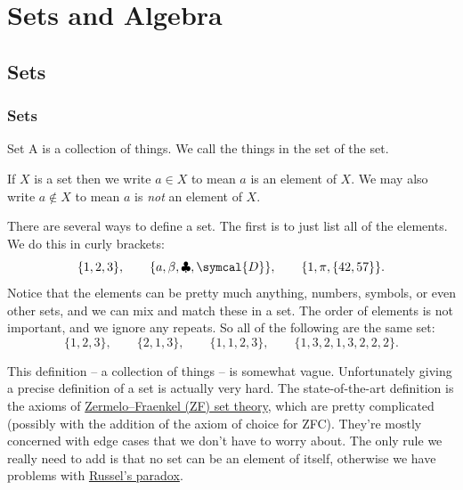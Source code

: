 \documentclass[fleqn]{LectureClass/LectureClass}
\begin{document}
    \part{Sets and Algebra}
    \chapter{Sets}
    \section{Sets}
    \begin{dfn}{Set}{}
        A  is a collection of things.
        We call the things in the set  of the set.
    \end{dfn}
    
    \begin{ntn}{}{}
        If \(X\) is a set then we write \(a \in X\) to mean \(a\) is an element of \(X\).
        We may also write \(a \notin X\) to mean \(a\) is \emph{not} an element of \(X\).
    \end{ntn}
    
    There are several ways to define a set.
    The first is to just list all of the elements.
    We do this in curly brackets:
    \begin{equation}
        \{1, 2, 3\}, \qquad \{a, \beta, \clubsuit, \symcal{D}\}, \qquad \{1, \pi, \{42, 57\}\}.
    \end{equation}
    Notice that the elements can be pretty much anything, numbers, symbols, or even other sets, and we can mix and match these in a set.
    The order of elements is not important, and we ignore any repeats.
    So all of the following are the same set:
    \begin{equation}
        \{1, 2, 3\}, \qquad \{2, 1, 3\}, \qquad \{1, 1, 2, 3\}, \qquad \{1, 3, 2, 1, 3, 2, 2, 2\}.
    \end{equation}
    
    \begin{remark}{}{}
        This definition -- a collection of things -- is somewhat vague.
        Unfortunately giving a precise definition of a set is actually very hard.
        The state-of-the-art definition is the axioms of \href{https://en.wikipedia.org/wiki/Zermelo%E2%80%93Fraenkel_set_theory}{Zermelo--Fraenkel (ZF) set theory}, which are pretty complicated (possibly with the addition of the axiom of choice for ZFC).
        They're mostly concerned with edge cases that we don't have to worry about.
        The only rule we really need to add is that no set can be an element of itself, otherwise we have problems with \href{https://en.wikipedia.org/wiki/Russell%27s_paradox}{Russel's paradox}.
    \end{remark}
    
\end{document}
